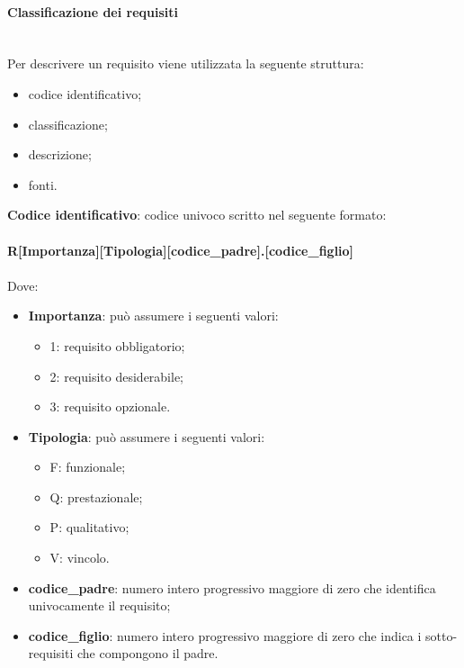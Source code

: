 		\paragraph*{Classificazione dei requisiti}\mbox{}\\ [1mm]
		Per descrivere un requisito viene utilizzata la seguente struttura:
		\begin{itemize}
			\item codice identificativo;
			\item classificazione;
			\item descrizione;
			\item fonti.
		\end{itemize} 
		\textbf{Codice identificativo}: codice univoco scritto nel seguente formato: \\
		\\ \textbf{R[Importanza][Tipologia][codice\_padre].[codice\_figlio]} \\
		\\ Dove:
		\begin{itemize}
			\item \textbf{Importanza}: può assumere i seguenti valori:
			\begin{itemize}
				\item 1: requisito obbligatorio;
				\item 2: requisito desiderabile;
				\item 3: requisito opzionale.
			\end{itemize}
			\item \textbf{Tipologia}: può assumere i seguenti valori:
			\begin{itemize}
				\item F: funzionale;
				\item Q: prestazionale;
				\item P: qualitativo;
				\item V: vincolo.
			\end{itemize}
			\item \textbf{codice\_padre}: numero intero progressivo maggiore di zero che identifica univocamente il requisito;
			\item \textbf{codice\_figlio}: numero intero progressivo maggiore di zero che indica i sotto-requisiti che compongono il padre. 
		\end{itemize}
